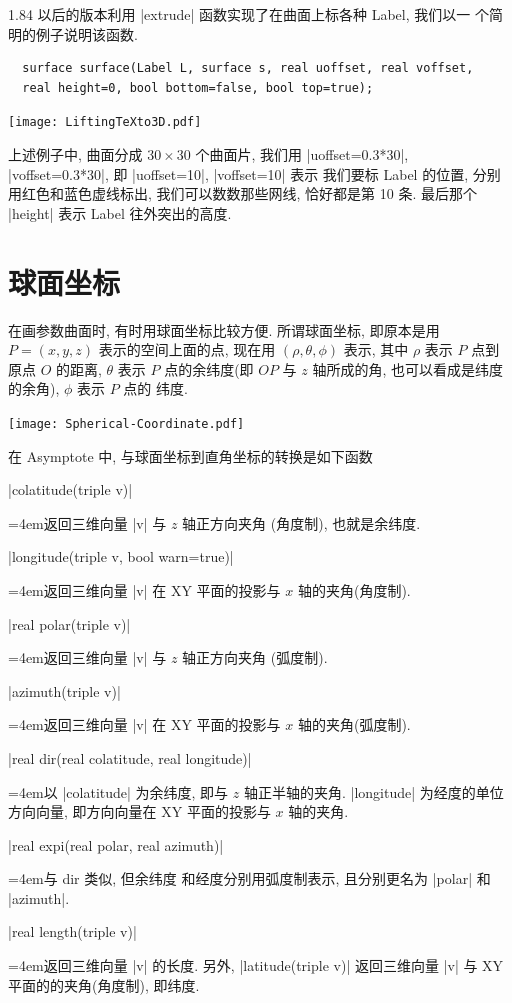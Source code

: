 \documentclass{ctexbook}
\newenvironment{funclist}{\trivlist
  \parindent=0pt
\item[]
  \def\item{\medskip\par\leftskip=0pt}
  \def\go{\par\leftskip=4em}}
{\endtrivlist}
\begin{document}
1.84 以后的版本利用 |extrude| 函数实现了在曲面上标各种 Label, 我们以一
个简明的例子说明该函数.
\begin{lstlisting}
  surface surface(Label L, surface s, real uoffset, real voffset,
  real height=0, bool bottom=false, bool top=true);
\end{lstlisting}
\begin{center}\texttt{[image: LiftingTeXto3D.pdf]}\end{center}%

上述例子中, 曲面分成 $30\times 30$ 个曲面片, 我们用
|uoffset=0.3*30|, |voffset=0.3*30|, 即 |uoffset=10|, |voffset=10| 表示
我们要标 Label 的位置, 分别用红色和蓝色虚线标出, 我们可以数数那些网线,
恰好都是第 10 条. 最后那个 |height| 表示 Label 往外突出的高度.

\section{球面坐标}
在画参数曲面时, 有时用球面坐标比较方便. 所谓球面坐标, 即原本是用
$P=(x,y,z)$ 表示的空间上面的点, 现在用 $(\rho,\theta,\phi)$ 表示, 其中
$\rho$ 表示 $P$ 点到原点 $O$ 的距离, $\theta$ 表示 $P$ 点的余纬度(即
$OP$ 与 $z$ 轴所成的角, 也可以看成是纬度的余角), $\phi$ 表示 $P$ 点的
纬度.
\begin{center}\texttt{[image: Spherical-Coordinate.pdf]}\end{center}%

在 Asymptote 中, 与球面坐标到直角坐标的转换是如下函数
\begin{funclist}
\item |colatitude(triple v)| \go 返回三维向量 |v| 与 $z$ 轴正方向夹角
  (角度制), 也就是余纬度.
\item |longitude(triple v, bool warn=true)| \go 返回三维向量 |v| 在 XY
  平面的投影与 $x$ 轴的夹角(角度制).
\item |real polar(triple v)| \go 返回三维向量 |v| 与 $z$ 轴正方向夹角
  (弧度制).
\item |azimuth(triple v)| \go 返回三维向量 |v| 在 XY 平面的投影与 $x$
  轴的夹角(弧度制).
\item |real dir(real colatitude, real longitude)| \go 以 |colatitude|
  为余纬度, 即与 $z$ 轴正半轴的夹角. |longitude| 为经度的单位方向向量,
  即方向向量在 XY 平面的投影与 $x$ 轴的夹角.
\item |real expi(real polar, real azimuth)| \go 与 dir 类似, 但余纬度
  和经度分别用弧度制表示, 且分别更名为 |polar| 和 |azimuth|.
\item |real length(triple v)| \go 返回三维向量 |v| 的长度.
\end{funclist}
另外, |latitude(triple v)| 返回三维向量 |v| 与 XY 平面的的夹角(角度制),
即纬度.
\end{document}
